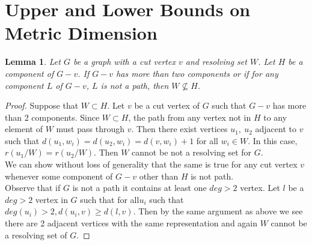 \documentclass[11pt]{amsart}
\theoremstyle{plain}  %
\newtheorem{lem}[thm]{Lemma}
\theoremstyle{definition}
\theoremstyle{remark}
\numberwithin{equation}{thm}
\begin{document}
\section{Upper and Lower Bounds on Metric Dimension}


 
\begin{lem}
 Let $G$ be a graph with a cut vertex $v$ and resolving set $W$. Let $H$ be a component of $G-v$. 
 If $G-v$ has more than two components or if for any component $L$ of $G-v$, $L$ is not a path, then $W\nsubseteq H$.
\end{lem}
\begin{proof}
 Suppose that $W \subset H$. 
 Let $v$ be a cut vertex of $G$ such that $G-v$ has more than 2 components. Since $W \subset H$, the path from any vertex not in $H$ to any element of $W$ must pass through $v$.
 Then there exist vertices $u_1,\ u_2$ adjacent to $v$ such that $d(u_1, w_i) = d(u_2, w_i) = d(v, w_i) + 1$ for all $w_i \in W$.
 In this case, $r(u_1/W) = r(u_2/W)$. Then $W$ cannot be not a resolving set for $G$.\\
 We can show without loss of generality that the same is true for any cut vertex $v$ whenever some component of $G-v$ other than $H$ is not path.\\
 Observe that if $G$ is not a path it contains at least one $deg > 2$ vertex. 
 Let $l$ be a $deg > 2$ vertex in $G$ such that for all$u_i$ such that $deg(u_i)>2, d(u_i, v) \geq d(l, v)$. 
 Then by the same argument as above we see there are 2 adjacent vertices with the same representation and again $W$ cannot be a resolving set of $G$.
 \end{proof}
\end{document}

